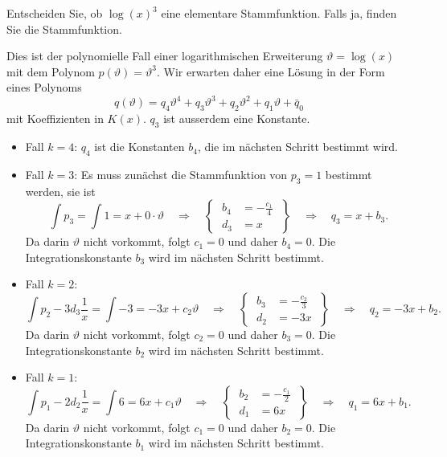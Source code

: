 Entscheiden Sie, ob $\log(x)^3$ eine elementare Stammfunktion.
Falls ja, finden Sie die Stammfunktion.

\begin{loesung}
Dies ist der polynomielle Fall einer logarithmischen Erweiterung
$\vartheta=\log(x)$ mit dem Polynom $p(\vartheta)=\vartheta^3$.
Wir erwarten daher eine Lösung in der Form eines Polynoms
\[
q(\vartheta)
=
q_4\vartheta^4
+
q_3\vartheta^3
+
q_2\vartheta^2
+
q_1\vartheta
+
\bar{q}_0
\]
mit Koeffizienten in $K(x)$.
$q_3$ ist ausserdem eine Konstante.
\begin{itemize}
\item
Fall $k=4$: $q_4$ ist die Konstanten $b_4$, die im nächsten Schritt
bestimmt wird.

\item
Fall $k=3$:
Es muss zunächst die Stammfunktion von $p_3=1$ bestimmt werden, sie
ist 
\[
\int p_3 = \int 1 = x + 0\cdot\vartheta
\quad\Rightarrow\quad 
\left\{\;
\begin{aligned}
b_4 &= -\frac{c_1}{4} \\
d_3 &= x
\end{aligned}
\;\right\}
\quad\Rightarrow\quad
q_3 = x + b_3.
\]
Da darin $\vartheta$ nicht vorkommt, folgt $c_1=0$ und daher $b_4=0$.
Die Integrationskonstante $b_3$ wird im nächsten Schritt bestimmt.

\item
Fall $k=2$:
\[
\int p_2 - 3d_3\frac{1}{x}
=
\int -3
=
-3x+c_2\vartheta
\quad\Rightarrow\quad
\left\{\;
\begin{aligned}
b_3 &= -\frac{c_2}{3}\\
d_2 &= -3x
\end{aligned}
\;\right\}
\quad\Rightarrow\quad 
q_2 = -3x + b_2.
\]
Da darin $\vartheta$ nicht vorkommt, folgt $c_2=0$ und daher $b_3=0$.
Die Integrationskonstante $b_2$ wird im nächsten Schritt bestimmt.

\item
Fall $k=1$:
\[
\int p_1 - 2d_2\frac{1}{x}
=
\int 6
=
6x + c_1\vartheta
\quad\Rightarrow\quad
\left\{\;
\begin{aligned}
b_2 &= -\frac{c_1}{2} \\
d_1 &= 6x
\end{aligned}
\;\right\}
\quad\Rightarrow\quad
q_1 = 6x + b_1.
\]
Da darin $\vartheta$ nicht vorkommt, folgt $c_1=0$ und daher $b_2=0$.
Die Integrationskonstante $b_1$ wird im nächsten Schritt bestimmt.


\end{itemize}
\end{loesung}

